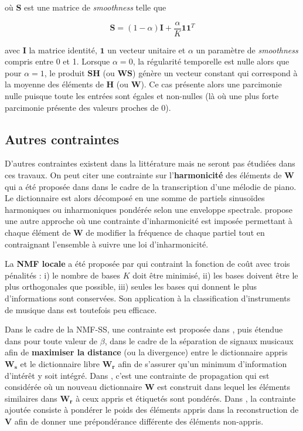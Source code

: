 où $\mathbf{S}$ est une matrice de \textit{smoothness} telle que

\begin{equation}
\mathbf{S} = (1-\alpha)\mathbf{I}+\frac{\alpha}{K}\mathbf{11}^T
\end{equation}

avec $\mathbf{I}$ la matrice identité, $\mathbf{1}$ un vecteur unitaire et $\alpha$ un paramètre de \textit{smoothness} compris entre 0 et 1. Lorsque $\alpha = 0$, la régularité temporelle est nulle alors que pour $\alpha = 1$, le produit $\mathbf{SH}$ (ou $\mathbf{WS}$) génère un vecteur constant qui correspond à la moyenne des éléments de $\mathbf{H}$ (ou $\mathbf{W}$). Ce cas présente alors une parcimonie nulle puisque toute les entrées sont égales et non-nulles (là où une plus forte parcimonie présente des valeurs proches de 0).

\subsection{Autres contraintes}

D'autres contraintes existent dans la littérature mais ne seront pas étudiées dans ces travaux.
On peut citer une contrainte sur l'\textbf{harmonicité} des éléments de $\mathbf{W}$ qui a été proposée dans \cite{vincent2008harmonic} dans le cadre de la transcription d'une mélodie de piano. Le dictionnaire est alors décomposé en une somme de partiels sinusoïdes harmoniques ou inharmoniques pondérée selon une enveloppe spectrale. \cite{rigaud2012piano} propose une autre approche où une contrainte d'inharmonicité est imposée permettant à chaque élément de $\mathbf{W}$ de modifier la fréquence de chaque partiel tout en contraignant l'ensemble à suivre une loi d'inharmonicité.

La \textbf{NMF locale} a été proposée par \cite{li2001learning} qui contraint la fonction de coût avec trois pénalités : i) le nombre de bases $K$ doit être minimisé, ii) les bases doivent être le plus orthogonales que possible, iii) seules les bases qui donnent le plus d'informations sont conservées. Son application à la classification d'instruments de musique dans \cite{benetos2006musical} est toutefois peu efficace.

Dans le cadre de la NMF-SS, une contrainte est proposée dans \cite{yagi2012music}, puis étendue dans \cite{kitamura2014music} pour toute valeur de $\beta$, dans le cadre de la séparation de signaux musicaux afin de \textbf{maximiser la distance} (ou la divergence) entre le dictionnaire appris $\mathbf{W_s}$ et le dictionnaire libre $\mathbf{W_r}$ afin de s'assurer qu'un minimum d'information d'intérêt y soit intégré. Dans \cite{wang2016semi}, c'est une contrainte de propagation qui est considérée où un nouveau dictionnaire $\mathbf{W}$ est construit dans lequel les éléments similaires dans $\mathbf{W_r}$ à ceux appris et étiquetés sont pondérés. Dans \cite{lefevre2012semi}, la contrainte ajoutée consiste à pondérer le poids des éléments appris dans la reconstruction de $\mathbf{V}$ afin de donner une prépondérance différente des éléments non-appris.\\

